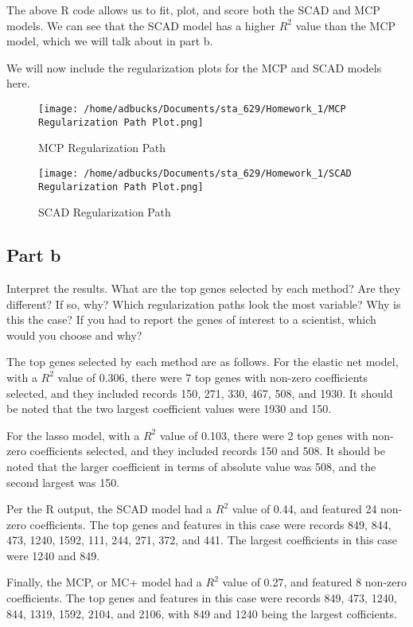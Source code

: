 \documentclass[12pt, letterpaper]{article}
\begin{document}
The above R code allows us to fit, plot, and score both the SCAD and MCP models.
We can see that the SCAD model has a higher $R^2$ value than the MCP model, which we will talk about in part b. 

We will now include the regularization plots for the MCP and SCAD models here. 

\begin{figure}
  \texttt{[image: /home/adbucks/Documents/sta\_629/Homework\_1/MCP Regularization Path Plot.png]}
  \caption{MCP Regularization Path}
\end{figure}


\begin{figure}
  \texttt{[image: /home/adbucks/Documents/sta\_629/Homework\_1/SCAD Regularization Path Plot.png]}
  \caption{SCAD Regularization Path}
\end{figure} 

\subsection{Part b} 

Interpret the results. What are the top genes selected by each method? Are they different? If so, why? Which regularization paths look the most variable? Why is this the case? If you had to report 
the genes of interest to a scientist, which would you choose and why? 

The top genes selected by each method are as follows. For the elastic net model, with a $R^2$ value of 0.306, there were 7 top genes with non-zero coefficients selected, and they included records 150, 271, 330, 467, 508, and 1930. It should be noted that the two largest coefficient values were 1930 and 150. 

For the lasso model, with a $R^2$ value of 0.103, there were 2 top genes with non-zero coefficients selected, and they included records 150 and 508. It should be noted that the larger coefficient in terms of absolute value was 508, and the second largest was 150. 

Per the R output, the SCAD model had a $R^2$ value of 0.44, and featured 24 non-zero coefficients. The top genes and features in this case were records 849, 844, 473, 1240, 1592, 111, 244, 271, 372, and 441. The largest coefficients in this case were 1240 and 849. 

Finally, the MCP, or MC+ model had a $R^2$ value of 0.27, and featured 8 non-zero coefficients. The top genes and features in this case were records 849, 473, 1240, 844, 1319, 1592, 2104, and 2106, with 849 and 1240 being the largest cofficients. 
\end{document}
